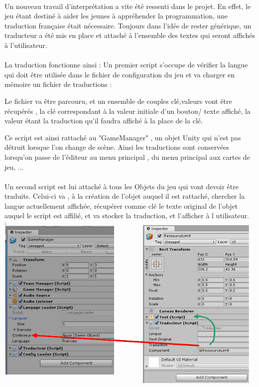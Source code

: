 \documentclass{report}
\begin{document}
\paragraph{}
Un nouveau travail d'interprétation a vite été ressenti dans le projet. En effet, le jeu étant destiné à aider les jeunes à appréhender la programmation, une traduction française était nécessaire.
Toujours dans l'idée de rester générique, un traducteur a été mis en place et attaché à l'ensemble des textes qui seront affichés à l'utilisateur.
\paragraph{}
La traduction fonctionne ainsi :
Un premier script s'occupe de vérifier la langue qui doit être utilisée dans le fichier de configuration du jeu et va charger en mémoire un fichier  de traductions : 

Le fichier va être parcouru, et un ensemble de couples clé,valeurs vont être récupérés , la clé correspondant à la valeur initiale d'un bouton/ texte affiché, la valeur étant la traduction qu'il faudra affiché à la place de la clé.

Ce script est ainsi rattaché au "GameManager" , un objet Unity qui n'est pas détruit lorsque l'on change de scène. Ainsi les traductions sont conservées lorsqu'on passe de l'éditeur au menu principal , du menu principal aux cartes de jeu, ...
\paragraph{}
Un second script est lui attaché à tous les Objets du jeu qui vont devoir être traduits. Celui-ci va , à la création de l'objet auquel il est rattaché, chercher la langue actuellement affichée, récupérer comme clé le texte original de l'objet auquel le script est affilié, et va stocker la traduction, et l'afficher à l utilisateur.
\includegraphics{traducteur2.png}
\end{document}
